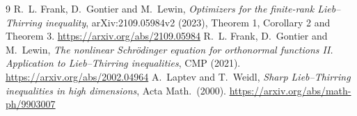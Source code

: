 \documentclass[11pt]{article}
\begin{document}
\begin{thebibliography}{9}
R.~L. Frank, D.~Gontier and M.~Lewin,
\emph{Optimizers for the finite-rank Lieb--Thirring inequality},
arXiv:2109.05984v2 (2023), Theorem 1, Corollary 2 and Theorem 3.
\url{https://arxiv.org/abs/2109.05984}
R.~L. Frank, D.~Gontier and M.~Lewin,
\emph{The nonlinear Schr\"odinger equation for orthonormal functions II.
Application to Lieb--Thirring inequalities}, CMP (2021).
\url{https://arxiv.org/abs/2002.04964}
A.~Laptev and T.~Weidl,
\emph{Sharp Lieb--Thirring inequalities in high dimensions},
Acta Math.\ (2000).
\url{https://arxiv.org/abs/math-ph/9903007}
\end{thebibliography}
\end{document}
